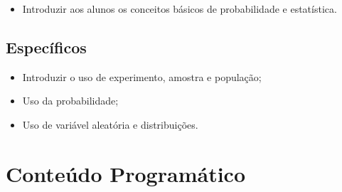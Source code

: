 \documentclass[
]{book}
\providecommand{\tightlist}{%
  \setlength{\itemsep}{0pt}\setlength{\parskip}{0pt}}
\begin{document}
\begin{itemize}
\tightlist
\item
  Introduzir aos alunos os conceitos básicos de probabilidade e estatística.
\end{itemize}

\hypertarget{especuxedficos}{%
\subsection{Específicos}\label{especuxedficos}}

\begin{itemize}
\tightlist
\item
  Introduzir o uso de experimento, amostra e população;
\item
  Uso da probabilidade;
\item
  Uso de variável aleatória e distribuições.
\end{itemize}

\hypertarget{conteuxfado-programuxe1tico}{%
\section{Conteúdo Programático}\label{conteuxfado-programuxe1tico}}
\end{document}
